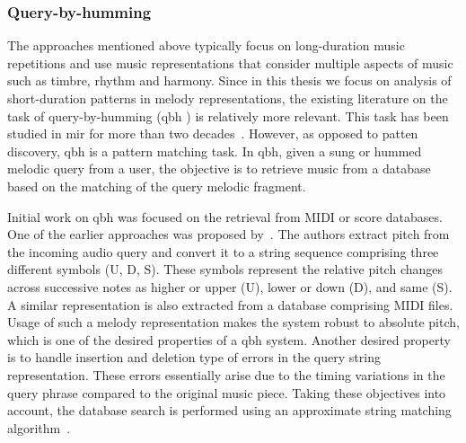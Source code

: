 

\subsubsection{Query-by-humming}
\label{sec:query_by_humming}

The approaches mentioned above typically focus on long-duration music repetitions  and use music representations that consider multiple aspects of music such as timbre, rhythm and harmony. Since in this thesis we focus on analysis of short-duration patterns in melody representations, the existing literature on the task of query-by-humming (\gls{qbh} ) is relatively more relevant. This task has been studied in \gls{mir} for more than two decades~\citep{ghias1995query,McNab1996}. However, as opposed to patten discovery, \gls{qbh}  is a pattern matching task. In \gls{qbh}, given a sung or hummed melodic query from a user, the objective is to retrieve music from a database based on the matching of the query melodic fragment. 

Initial work on \gls{qbh}  was focused on the retrieval from MIDI or score databases. One of the earlier approaches was proposed by~\cite{ghias1995query}. The authors extract pitch from the incoming audio query and convert it to a string sequence comprising three different symbols (U, D, S). These symbols represent the relative pitch changes across successive notes as higher or upper (U), lower or down (D), and same (S). A similar representation is also extracted from a database comprising MIDI files. Usage of such a melody representation makes the system robust to absolute pitch, which is one of the desired properties of a \gls{qbh} system. Another desired property is to handle insertion and deletion type of errors in the query string representation. These errors essentially arise due to the timing variations in the query phrase compared to the original music piece. Taking these objectives into account, the database search is performed using an approximate string matching algorithm~\citep{baeza1992fast}.

